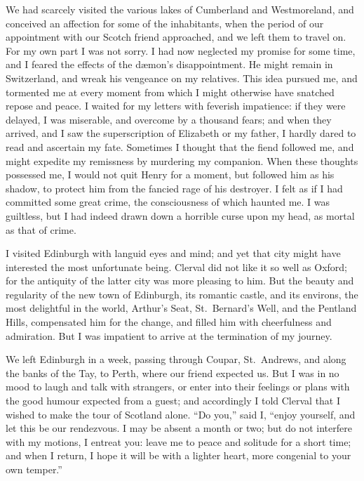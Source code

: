 We had scarcely visited the various
lakes of Cumberland and Westmoreland,
and conceived an affection for
some of the inhabitants, when the period
of our appointment with our Scotch
friend approached, and we left them to
travel on. For my own part I was not
sorry. I had now neglected my promise
for some time, and I feared the effects
of the dæmon's disappointment. He
might remain in Switzerland, and wreak
his vengeance on my relatives. This
idea pursued me, and tormented me at
every moment from which I might otherwise
have snatched repose and peace. I
waited for my letters with feverish impatience:
if they were delayed, I was
miserable, and overcome by a thousand
fears; and when they arrived, and I saw
the superscription of Elizabeth or my
father, I hardly dared to read and ascertain
my fate. Sometimes I thought
that the fiend followed me, and might
expedite my remissness by murdering
my companion. When these thoughts
possessed me, I would not quit Henry
for a moment, but followed him as his
shadow, to protect him from the fancied
rage of his destroyer. I felt as if I
had committed some great crime, the
consciousness of which haunted me. I
was guiltless, but I had indeed drawn
down a horrible curse upon my head,
as mortal as that of crime.

I visited Edinburgh with languid
eyes and mind; and yet that city might
have interested the most unfortunate
being. Clerval did not like it so well
as Oxford; for the antiquity of the latter
city was more pleasing to him. But
the beauty and regularity of the new
town of Edinburgh, its romantic castle,
and its environs, the most delightful
in the world, Arthur's Seat, St.~Bernard's
Well, and the Pentland Hills,
compensated him for the change, and
filled him with cheerfulness and admiration.
But I was impatient to
arrive at the termination of my journey.

We left Edinburgh in a week, passing
through Coupar, St.~Andrews, and
along the banks of the Tay, to Perth,
where our friend expected us. But
I was in no mood to laugh and talk
with strangers, or enter into their feelings
or plans with the good humour
expected from a guest; and accordingly
I told Clerval that I wished to
make the tour of Scotland alone. ``Do
you,'' said I, ``enjoy yourself, and let
this be our rendezvous. I may be absent
a month or two; but do not
interfere with my motions, I entreat
you: leave me to peace and solitude
for a short time; and when I return, I
hope it will be with a lighter heart,
more congenial to your own temper.''


